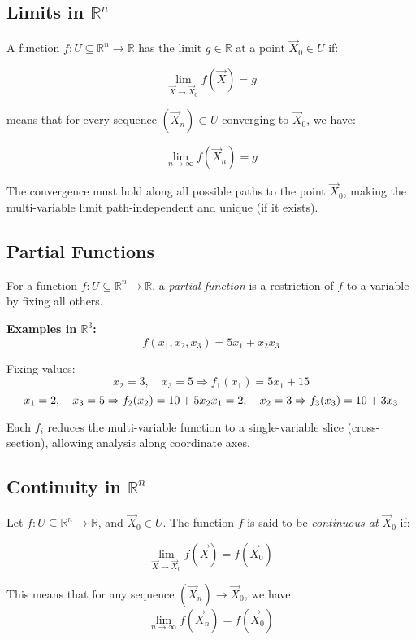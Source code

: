 \subsection{Limits in \( \mathbb{R}^n \)}

A function \( f : U \subseteq \mathbb{R}^n \to \mathbb{R} \) has the limit \( g \in \mathbb{R} \) at a point \( \vec{X}_0 \in U \) if:

\[
\lim_{\vec{X} \to \vec{X}_0} f(\vec{X}) = g
\]

means that for every sequence \( (\vec{X}_n) \subset U \) converging to \( \vec{X}_0 \), we have:

\[
\lim_{n \to \infty} f(\vec{X}_n) = g
\]

The convergence must hold along all possible paths to the point \( \vec{X}_0 \), making the multi-variable limit path-independent and unique (if it exists).


\subsection{Partial Functions}

For a function \( f: U \subseteq \mathbb{R}^n \to \mathbb{R} \), a \emph{partial function} is a restriction of \( f \) to a variable by fixing all others.

\textbf{Examples in \( \mathbb{R}^3 \):}
\[
f(x_1, x_2, x_3) = 5x_1 + x_2 x_3
\]

Fixing values:
\[
x_2 = 3, \quad x_3 = 5 \Rightarrow f_1(x_1) = 5x_1 + 15 
\]
\[
x_1 = 2, \quad x_3 = 5 \Rightarrow f_2(x_2) = 10 + 5x_2 \\
x_1 = 2, \quad x_2 = 3 \Rightarrow f_3(x_3) = 10 + 3x_3
\]

Each \( f_i \) reduces the multi-variable function to a single-variable slice (cross-section), allowing analysis along coordinate axes.


\subsection{Continuity in \( \mathbb{R}^n \)}

Let \( f : U \subseteq \mathbb{R}^n \to \mathbb{R} \), and \( \vec{X}_0 \in U \). The function \( f \) is said to be \emph{continuous at \( \vec{X}_0 \)} if:

\[
\lim_{\vec{X} \to \vec{X}_0} f(\vec{X}) = f(\vec{X}_0)
\]

This means that for any sequence \( (\vec{X}_n) \to \vec{X}_0 \), we have:
\[
\lim_{n \to \infty} f(\vec{X}_n) = f(\vec{X}_0)
\]

